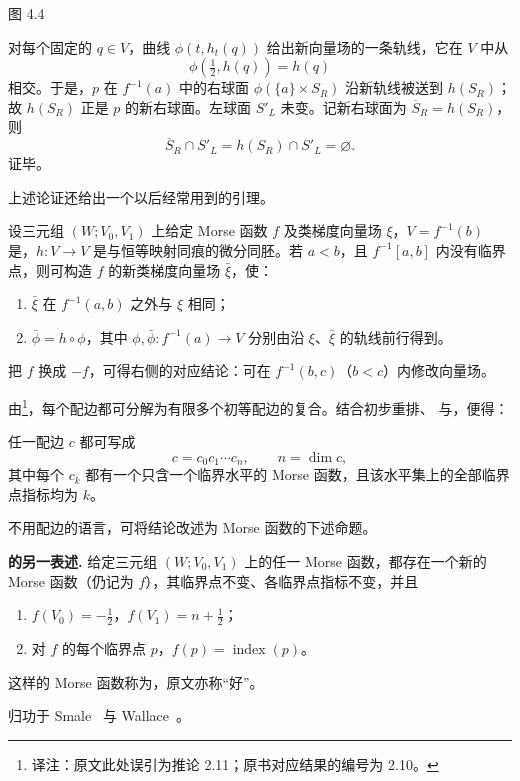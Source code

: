 \begin{center}
  \FigFourFour

  \label{fig:4.4}图 4.4
\end{center}

对每个固定的 $q\in V$，曲线 $\phi(t,h_t(q))$ 给出新向量场的一条轨线，它在 $V$ 中从
\[
  \phi(\tfrac12,h(q))=h(q)
\]
相交。于是，$p$ 在 $f^{-1}(a)$ 中的右球面 $\phi(\{a\}\times S_R)$ 沿新轨线被送到 $h(S_R)$；故 $h(S_R)$ 正是 $p$ 的新右球面。左球面 $S'_L$ 未变。记新右球面为 $\overline S_R=h(S_R)$，则
\[
  \overline S_R\cap S'_L=h(S_R)\cap S'_L=\varnothing.
\]
 证毕。
\EndProof

上述论证还给出一个以后经常用到的引理。

设三元组 $(W;V_0,V_1)$ 上给定 Morse 函数 $f$ 及类梯度向量场 $\xi$，$V=f^{-1}(b)$ 是，$h:V\to V$ 是与恒等映射同痕的微分同胚。若 $a<b$，且 $f^{-1}[a,b]$ 内没有临界点，则可构造 $f$ 的新类梯度向量场 $\bar\xi$，使：
\begin{enumerate}[label=(\alph*)]
  \item $\bar\xi$ 在 $f^{-1}(a,b)$ 之外与 $\xi$ 相同；
  \item $\bar\phi=h\circ\phi$，其中 $\phi,\bar\phi:f^{-1}(a)\to V$ 分别由沿 $\xi$、$\bar\xi$ 的轨线前行得到。
\end{enumerate}

把 $f$ 换成 $-f$，可得右侧的对应结论：可在 $f^{-1}(b,c)$（$b<c$）内修改向量场。

由\footnote{译注：原文此处误引为推论 2.11；原书对应结果的编号为 2.10。}，每个配边都可分解为有限多个初等配边的复合。结合初步重排、 与，便得：

任一配边 $c$ 都可写成
\[
  c=c_0c_1\cdots c_n,
  \qquad n=\dim c,
\]
其中每个 $c_k$ 都有一个只含一个临界水平的 Morse 函数，且该水平集上的全部临界点指标均为 $k$。

不用配边的语言，可将结论改述为 Morse 函数的下述命题。

\par\medskip\noindent\textbf{ 的另一表述.}\quad
给定三元组 $(W;V_0,V_1)$ 上的任一 Morse 函数，都存在一个新的 Morse 函数（仍记为 $f$），其临界点不变、各临界点指标不变，并且
\begin{enumerate}[label=(\arabic*)]
  \item $f(V_0)=-\tfrac12$，$f(V_1)=n+\tfrac12$；
  \item 对 $f$ 的每个临界点 $p$，$f(p)=\operatorname{index}(p)$。
\end{enumerate}

这样的 Morse 函数称为\emph{}，原文亦称“好”。

 归功于 Smale~\cite{ref08} 与 Wallace~\cite{ref09}。
